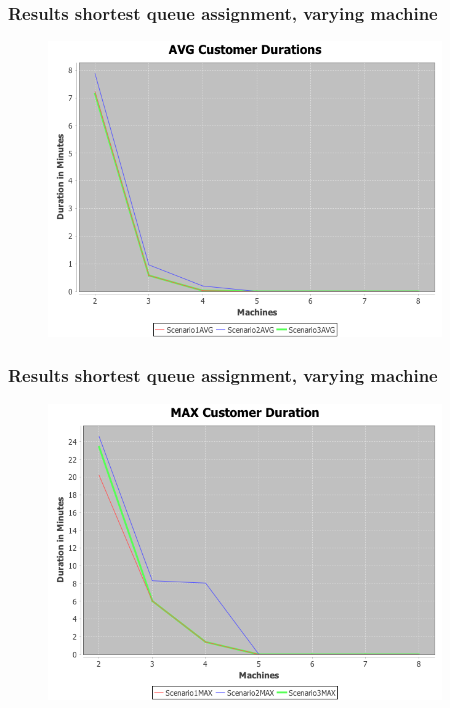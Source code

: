 \documentclass{beamer}
\begin{document}
\begin{frame}
\frametitle{Results shortest queue assignment, varying machine}
\begin{figure}
\centering
\includegraphics[width=0.93\textwidth]{results/Output_AVG_random_false.png}
\end{figure}
\end{frame}

\begin{frame}
\frametitle{Results shortest queue assignment, varying machine}
\begin{figure}
\centering
\includegraphics[width=0.93\textwidth]{results/Output_MAX_random_false.png}
\end{figure}
\end{frame}
\end{document}
